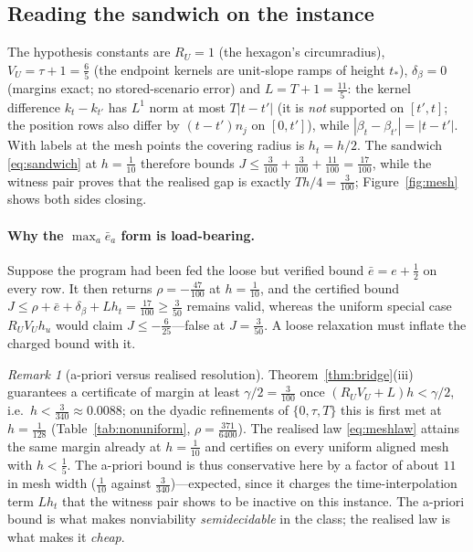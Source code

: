 \documentclass[11pt,a4paper]{article}
\theoremstyle{plain}
\theoremstyle{definition}
\theoremstyle{remark}
\newtheorem{remark}[theorem]{Remark}
\newcommand{\ebar}{\bar{e}}
\newcommand{\tfr}[2]{\tfrac{#1}{#2}}
\begin{document}
\subsection{Reading the sandwich on the instance}\label{sec:sandwich}

The hypothesis constants are $R_U=1$ (the hexagon's circumradius), $V_U=\tau+1=\tfr65$ (the endpoint kernels are unit-slope ramps of height $t_\ast$), $\delta_\beta=0$ (margins exact; no stored-scenario error) and $L=T+1=\tfr{11}5$: the kernel difference $k_t-k_{t'}$ has $L^1$ norm at most $T|t-t'|$ (it is \emph{not} supported on $[t',t]$; the position rows also differ by $(t-t')n_j$ on $[0,t']$), while $|\beta_t-\beta_{t'}|=|t-t'|$. With labels at the mesh points the covering radius is $h_t=h/2$. The sandwich \eqref{eq:sandwich} at $h=\tfr1{10}$ therefore bounds $J\le\tfr3{100}+\tfr3{100}+\tfr{11}{100}=\tfr{17}{100}$, while the witness pair proves that the realised gap is exactly $Th/4=\tfr3{100}$; Figure~\ref{fig:mesh} shows both sides closing.

\paragraph{Why the $\max_a\ebar_a$ form is load-bearing.}
Suppose the program had been fed the loose but verified bound $\ebar=e+\tfr12$ on every row. It then returns $\rho=-\tfr{47}{100}$ at $h=\tfr1{10}$, and the certified bound $J\le\rho+\ebar+\delta_\beta+Lh_t=\tfr{17}{100}\ge\tfr3{50}$ remains valid, whereas the uniform special case $R_UV_Uh_u$ would claim $J\le-\tfr6{25}$---false at $J=\tfr3{50}$. A loose relaxation must inflate the charged bound with it.

\begin{remark}[a-priori versus realised resolution]\label{rem:apriori}
Theorem~\ref{thm:bridge}(iii) guarantees a certificate of margin at least $\gamma/2=\tfr3{100}$ once $(R_UV_U+L)h<\gamma/2$, i.e.\ $h<\tfr3{340}\approx0.0088$; on the dyadic refinements of $\{0,\tau,T\}$ this is first met at $h=\tfr1{128}$ (Table~\ref{tab:nonuniform}, $\rho=\tfr{371}{6400}$). The realised law \eqref{eq:meshlaw} attains the same margin already at $h=\tfr1{10}$ and certifies on every uniform aligned mesh with $h<\tfr15$. The a-priori bound is thus conservative here by a factor of about $11$ in mesh width ($\tfr1{10}$ against $\tfr3{340}$)---expected, since it charges the time-interpolation term $Lh_t$ that the witness pair shows to be inactive on this instance. The a-priori bound is what makes nonviability \emph{semidecidable} in the class; the realised law is what makes it \emph{cheap}.
\end{remark}
\end{document}
